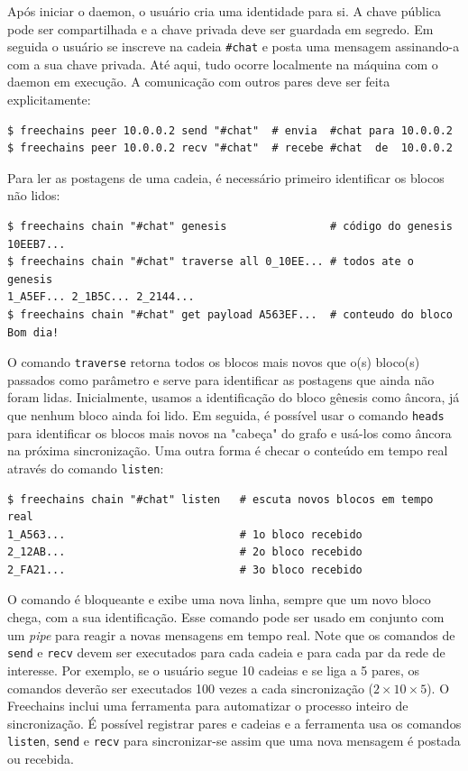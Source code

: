 \documentclass[12pt]{article}
\newcommand{\FC} {Freechains\xspace}
\begin{document}
Após iniciar o daemon, o usuário cria uma identidade para si.
A chave pública pode ser compartilhada e a chave privada deve ser guardada em
segredo.
Em seguida o usuário se inscreve na cadeia \texttt{\#chat} e posta uma mensagem
assinando-a com a sua chave privada.
Até aqui, tudo ocorre localmente na máquina com o daemon em execução.
A comunicação com outros pares deve ser feita explicitamente:
%
{\footnotesize
\begin{verbatim}
$ freechains peer 10.0.0.2 send "#chat"  # envia  #chat para 10.0.0.2
$ freechains peer 10.0.0.2 recv "#chat"  # recebe #chat  de  10.0.0.2
\end{verbatim}
}
%
Para ler as postagens de uma cadeia, é necessário primeiro identificar os
blocos não lidos:
%
{\footnotesize
\begin{verbatim}
$ freechains chain "#chat" genesis                # código do genesis
10EEB7...
$ freechains chain "#chat" traverse all 0_10EE... # todos ate o genesis
1_A5EF... 2_1B5C... 2_2144...
$ freechains chain "#chat" get payload A563EF...  # conteudo do bloco
Bom dia!
\end{verbatim}
}

O comando \texttt{traverse} retorna todos os blocos mais novos que o(s)
bloco(s) passados como parâmetro e serve para identificar as postagens que
ainda não foram lidas.
Inicialmente, usamos a identificação do bloco gênesis como âncora, já que
nenhum bloco ainda foi lido.
Em seguida, é possível usar o comando \texttt{heads} para identificar os blocos
mais novos na "cabeça" do grafo e usá-los como âncora na próxima sincronização.
%
Uma outra forma é checar o conteúdo em tempo real através do comando
\texttt{listen}:
%
{\footnotesize
\begin{verbatim}
$ freechains chain "#chat" listen   # escuta novos blocos em tempo real
1_A563...                           # 1o bloco recebido
2_12AB...                           # 2o bloco recebido
2_FA21...                           # 3o bloco recebido
\end{verbatim}
}
%
O comando é bloqueante e exibe uma nova linha, sempre que um novo bloco chega,
com a sua identificação.
Esse comando pode ser usado em conjunto com um \emph{pipe} para reagir a novas
mensagens em tempo real.
%
Note que os comandos de \texttt{send} e \texttt{recv} devem ser executados para
cada cadeia e para cada par da rede de interesse.
Por exemplo, se o usuário segue 10 cadeias e se liga a 5 pares, os comandos
deverão ser executados 100 vezes a cada sincronização ($2\times10\times5$).
O \FC inclui uma ferramenta para automatizar o processo inteiro de
sincronização.
É possível registrar pares e cadeias e a ferramenta usa os comandos
\texttt{listen}, \texttt{send} e \texttt{recv} para sincronizar-se assim que
uma nova mensagem é postada ou recebida.
\end{document}
